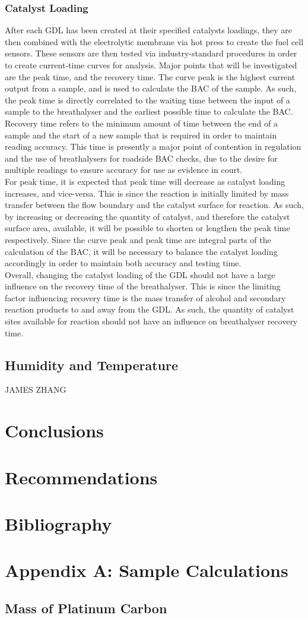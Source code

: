 \documentclass{article}
\begin{document}
    	\subsubsection{Catalyst Loading}
      After each GDL has been created at their specified catalysts loadings, they are then combined with the electrolytic membrane via hot press to create the fuel cell sensors. These sensors are then tested via industry-standard procedures in order to create current-time curves for analysis. Major points that will be investigated are the peak time, and the recovery time. The curve peak is the highest current output from a sample, and is used to calculate the BAC of the sample. As such, the peak time is directly correlated to the waiting time between the input of a sample to the breathalyser and the earliest possible time to calculate the BAC. Recovery time refers to the minimum amount of time between the end of a sample and the start of a new sample that is required in order to maintain reading accuracy. This time is presently a major point of contention in regulation and the use of breathalysers for roadside BAC checks, due to the desire for multiple readings to ensure accuracy for use as evidence in court.\\
      For peak time, it is expected that peak time will decrease as catalyst loading increases, and vice-versa. This is since the reaction is initially limited by mass transfer between the flow boundary and the catalyst surface for reaction. As such, by increasing or decreasing the quantity of catalyst, and therefore the catalyst surface area, available, it will be possible to shorten or lengthen the peak time respectively. Since the curve peak and peak time are integral parts of the calculation of the BAC, it will be necessary to balance the catalyst loading accordingly in order to maintain both accuracy and testing time.\\
      Overall, changing the catalyst loading of the GDL should not have a large influence on the recovery time of the breathalyser. This is since the limiting factor influencing recovery time is the mass transfer of alcohol and secondary reaction products to and away from the GDL. As such, the quantity of catalyst sites available for reaction should not have an influence on breathalyser recovery time.
      \subsection{Humidity and Temperature}
      JAMES ZHANG
    \section{Conclusions}
	\section{Recommendations}
	\section{Bibliography}
	\section{Appendix A: Sample Calculations}
	\subsection{Mass of Platinum Carbon}
\end{document}
